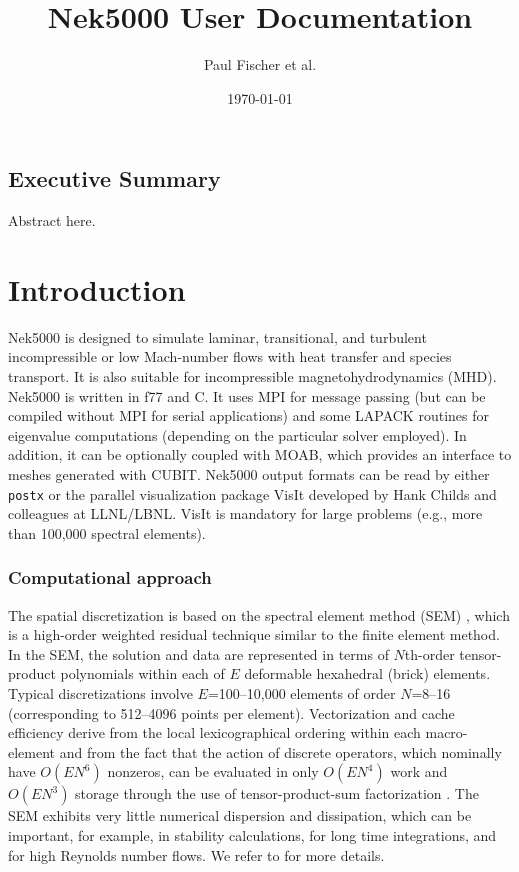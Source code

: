 \documentclass[11pt]{report}              %
\title{Nek5000 User Documentation}    %
\author{Paul Fischer et al.}              %
\date{\today}                           %
\begin{document}

\maketitle
\clearpage
\thispagestyle{empty}
\tableofcontents
\clearpage

\section*{Executive Summary} 


Abstract here.

\newpage

\setcounter{page}{1}

\chapter{Introduction}

Nek5000 is designed to simulate laminar, transitional, and turbulent
incompressible or low Mach-number flows with heat transfer and species
transport. It is also suitable for incompressible magnetohydrodynamics
(MHD). Nek5000 is written in f77 and C. It uses MPI for message passing
(but can be compiled without MPI for serial applications)
and some LAPACK routines for eigenvalue computations (depending on
the particular solver employed).  In addition, it can be optionally
coupled with MOAB, which provides an interface to meshes generated with 
CUBIT. Nek5000 output formats can be read by either {\tt postx} or the parallel visualization 
package VisIt developed by Hank Childs and colleagues at LLNL/LBNL.
VisIt is mandatory for large problems (e.g., more than 100,000 
spectral elements).
\subsection*{Computational approach}
The spatial discretization is based on 
the spectral element method (SEM) \cite{pat84}, which is a high-order 
weighted residual technique similar to the finite element method.   
In the SEM, the solution and data are represented in terms of 
\(N\)th-order tensor-product polynomials within each of \(E\) deformable 
hexahedral (brick) elements. Typical discretizations involve \(E\)=100--10,000 elements of order 
\(N\)=8--16 (corresponding to 512--4096 points per element).
Vectorization and cache efficiency derive from the local lexicographical
ordering within each macro-element and from the fact that the action of
discrete operators, which nominally have \(O(EN^6)\) nonzeros, can be evaluated
in only \(O(EN^4)\) work and \(O(EN^3)\) storage through the use of 
tensor-product-sum factorization \cite{sao80}.   The SEM exhibits 
very little numerical dispersion and dissipation, which can be important, 
for example, in stability calculations, for long time integrations, 
and for high Reynolds number flows. We refer to \cite{dfm02} for more
details.

\end{document}

